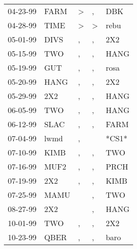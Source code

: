 \begin{supertabular}{p{0.07\textwidth}p{0.06\textwidth}p{0.02\textwidth}p{0.02\textwidth}p{0.06\textwidth}}
 04-23-99\textsuperscript{} &  FARM\textsuperscript{} &     \textgreater &             , &   DBK\textsuperscript{} \\
 04-28-99\textsuperscript{} &  TIME\textsuperscript{} &     \textgreater &  \textgreater &  rebu\textsuperscript{} \\
 05-01-99\textsuperscript{} &  DIVS\textsuperscript{} &                , &             , &   2X2\textsuperscript{} \\
 05-15-99\textsuperscript{} &   TWO\textsuperscript{} &                , &             , &  HANG\textsuperscript{} \\
 05-19-99\textsuperscript{} &   GUT\textsuperscript{} &                , &             , &  rosa\textsuperscript{} \\
 05-20-99\textsuperscript{} &  HANG\textsuperscript{} &                , &             , &   2X2\textsuperscript{} \\
 05-29-99\textsuperscript{} &   2X2\textsuperscript{} &                , &             , &  HANG\textsuperscript{} \\
 06-05-99\textsuperscript{} &   TWO\textsuperscript{} &                , &             , &  HANG\textsuperscript{} \\
 06-12-99\textsuperscript{} &  SLAC\textsuperscript{} &                , &             , &  FARM\textsuperscript{} \\
 07-04-99\textsuperscript{} &  lwmd\textsuperscript{} &                , &               &                   *CS1* \\
 07-10-99\textsuperscript{} &  KIMB\textsuperscript{} &                , &             , &   TWO\textsuperscript{} \\
 07-16-99\textsuperscript{} &  MUF2\textsuperscript{} &                , &             , &  PRCH\textsuperscript{} \\
 07-19-99\textsuperscript{} &   2X2\textsuperscript{} &                , &             , &  KIMB\textsuperscript{} \\
 07-25-99\textsuperscript{} &  MAMU\textsuperscript{} &                  &             , &   TWO\textsuperscript{} \\
 08-27-99\textsuperscript{} &   2X2\textsuperscript{} &                  &             , &  HANG\textsuperscript{} \\
 10-01-99\textsuperscript{} &   TWO\textsuperscript{} &                , &             , &   2X2\textsuperscript{} \\
 10-23-99\textsuperscript{} &  QBER\textsuperscript{} &                , &             , &  baro\textsuperscript{} \\

\end{supertabular}
